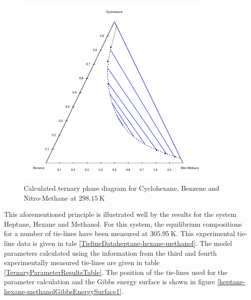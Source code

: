 \begin{figure}[h]
\centering
\includegraphics[width = 0.85\textwidth, bb=50 50 900 900]{Results_Parts/TernaryParams/cyclohexane-benzene-methanenitro/DWPM/CalculatedPhaseDiagram.png}
\caption{Calculated ternary phase diagram for Cyclohexane, Benzene and Nitro-Methane at $298.15~\mathrm{K}$} \label{cyclohexane-benzene-methanenitroFigure}
\end{figure}	
\clearpage

This aforementioned principle is illustrated well by the results for the system Heptane, Hexane and Methanol. For this system, the equilibrium compositions for a number of tie-lines have been measured at $305.95~\mathrm{K}$. This experimental tie-line data is given in tale \ref{TielineDataheptane-hexane-methanol}. The model parameters calculated using the information from the third and fourth experimentally measured tie-lines are given in table \ref{TernaryParameterResultsTable}. The position of the tie-lines used for the parameter calculation and the Gibbs energy surface is shown in figure \ref{heptane-hexane-methanolGibbsEnergySurface1}.\\

